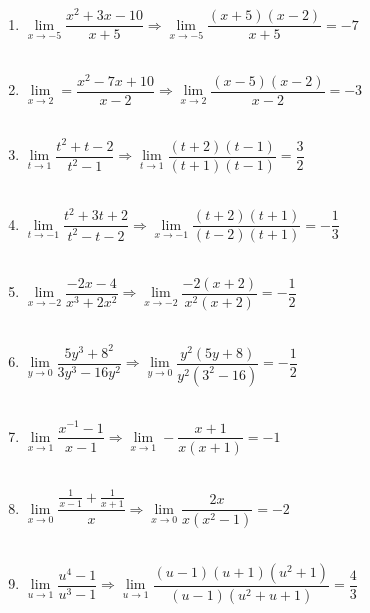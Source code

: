 \begin{enumerate}
\item $\lim\limits_{x\to -5}\dfrac{x^2 + 3x - 10}{x+5} \Longrightarrow \lim\limits_{x\to -5}\dfrac{(x+5)(x-2)}{x+5} = -7$\\\\

\item $\lim\limits_{x\to 2} = \dfrac{x^2-7x + 10}{x-2} \Longrightarrow \lim\limits_{x\to 2}\dfrac{(x-5)(x-2)}{x-2} = -3$\\\\

\item $\lim\limits_{t\to 1} \dfrac{t^2+t-2}{t^2-1} \Longrightarrow \lim\limits_{t\to 1}\dfrac{(t+2)(t-1)}{(t+1)(t-1)} = \dfrac{3}{2}$\\\\

\item $\lim\limits_{t\to -1} \dfrac{t^2+3t+2}{t^2-t-2} \Longrightarrow\lim\limits_{x\to -1}\dfrac{(t+2)(t+1)}{(t-2)(t+1)} = -\dfrac{1}{3}$\\\\

\item $\lim\limits_{x\to -2}\dfrac{-2x-4}{x^3+2x^2} \Longrightarrow \lim\limits_{x\to -2}\dfrac{-2(x+2)}{x^2(x+2)} = -\dfrac{1}{2}$\\\\

\item $\lim\limits_{y\to 0}\dfrac{5y^3+8^2}{3y^3-16y^2} \Longrightarrow \lim\limits_{y\to 0} \dfrac{y^2(5y+8)}{y^2(3^2-16)} = -\dfrac{1}{2}$\\\\

\item $\lim\limits_{x\to 1} \dfrac{x^{-1}-1}{x-1} \Longrightarrow \lim\limits_{x\to 1} -\dfrac{x+1}{x(x+1)} = -1$\\\\ 

\item $\lim\limits_{x\to 0} \dfrac{\frac{1}{x-1}+\frac{1}{x+1}}{x} \Longrightarrow \lim\limits_{x\to 0} \dfrac{2x}{x(x^2-1)} = -2$\\\\

\item $\lim\limits_{u\to 1}\dfrac{u^4 - 1}{u^3 - 1} \Longrightarrow \lim\limits_{u\to 1} \dfrac{(u-1)(u+1)(u^2+1)}{(u-1)(u^2+u+1)} = \dfrac{4}{3}$\\\\


\end{enumerate}
